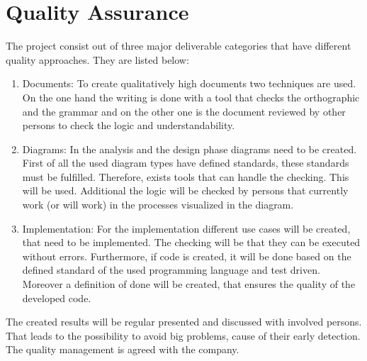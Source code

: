 \section{Quality Assurance}
The project consist out of three major deliverable categories that have different quality approaches. They are listed below:
\begin{enumerate}
	\item Documents: \newline
	To create qualitatively high documents two techniques are used. On the one hand the writing is done with a tool that checks the orthographic and the grammar and on the other one is the document reviewed by other persons to check the logic and understandability. 
	\item Diagrams: \newline
	In the analysis and the design phase diagrams need to be created. First of all the used diagram types have defined standards, these standards must be fulfilled. Therefore, exists tools that can handle the checking. This will be used. Additional the logic will be checked by persons that currently work (or will work) in the processes visualized in the diagram. 
	\item Implementation: \newline
	For the implementation different use cases will be created, that need to be implemented. The checking will be that they can be executed without errors. Furthermore, if code is created, it will be done based on the defined standard of the used programming language and test driven. Moreover a definition of done will be created, that ensures the quality of the developed code.
\end{enumerate}
The created results will be regular presented and discussed with involved persons. That leads to the possibility to avoid big problems, cause of their early detection. The quality management is agreed with the company. 

